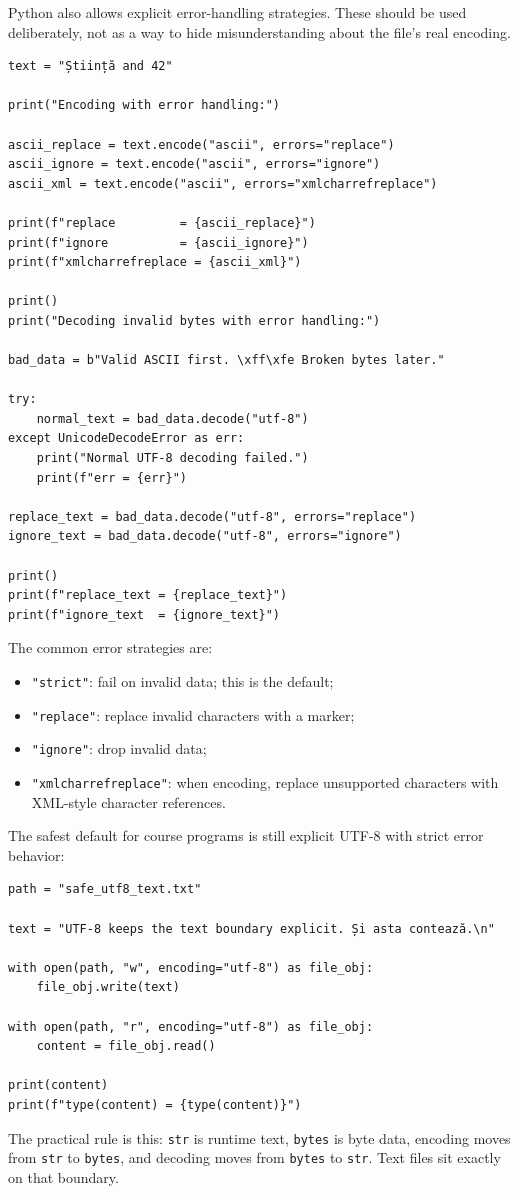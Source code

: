 Python also allows explicit error-handling strategies. These should be used deliberately, not as a way to hide misunderstanding about the file's real encoding.

\begin{verbatim}
text = "Știință and 42"

print("Encoding with error handling:")

ascii_replace = text.encode("ascii", errors="replace")
ascii_ignore = text.encode("ascii", errors="ignore")
ascii_xml = text.encode("ascii", errors="xmlcharrefreplace")

print(f"replace         = {ascii_replace}")
print(f"ignore          = {ascii_ignore}")
print(f"xmlcharrefreplace = {ascii_xml}")

print()
print("Decoding invalid bytes with error handling:")

bad_data = b"Valid ASCII first. \xff\xfe Broken bytes later."

try:
    normal_text = bad_data.decode("utf-8")
except UnicodeDecodeError as err:
    print("Normal UTF-8 decoding failed.")
    print(f"err = {err}")

replace_text = bad_data.decode("utf-8", errors="replace")
ignore_text = bad_data.decode("utf-8", errors="ignore")

print()
print(f"replace_text = {replace_text}")
print(f"ignore_text  = {ignore_text}")
\end{verbatim}

The common error strategies are:

\begin{itemize}
    \item \texttt{"strict"}: fail on invalid data; this is the default;
    \item \texttt{"replace"}: replace invalid characters with a marker;
    \item \texttt{"ignore"}: drop invalid data;
    \item \texttt{"xmlcharrefreplace"}: when encoding, replace unsupported characters with XML-style character references.
\end{itemize}

The safest default for course programs is still explicit UTF-8 with strict error behavior:

\begin{verbatim}
path = "safe_utf8_text.txt"

text = "UTF-8 keeps the text boundary explicit. Și asta contează.\n"

with open(path, "w", encoding="utf-8") as file_obj:
    file_obj.write(text)

with open(path, "r", encoding="utf-8") as file_obj:
    content = file_obj.read()

print(content)
print(f"type(content) = {type(content)}")
\end{verbatim}

The practical rule is this: \texttt{str} is runtime text, \texttt{bytes} is byte data, encoding moves from \texttt{str} to \texttt{bytes}, and decoding moves from \texttt{bytes} to \texttt{str}. Text files sit exactly on that boundary.